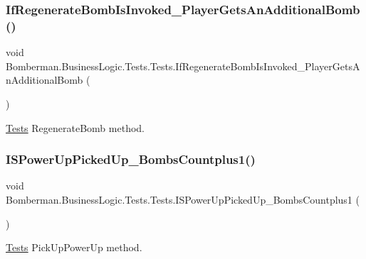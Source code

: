 \subsubsection{\texorpdfstring{IfRegenerateBombIsInvoked\_PlayerGetsAnAdditionalBomb()}{IfRegenerateBombIsInvoked\_PlayerGetsAnAdditionalBomb()}}
{\footnotesize\ttfamily void Bomberman.\+Business\+Logic.\+Tests.\+Tests.\+If\+Regenerate\+Bomb\+Is\+Invoked\+\_\+\+Player\+Gets\+An\+Additional\+Bomb (\begin{DoxyParamCaption}{ }\end{DoxyParamCaption})\hspace{0.3cm}{\ttfamily [inline]}}



\mbox{\hyperlink{class_bomberman_1_1_business_logic_1_1_tests_1_1_tests}{Tests}} Regenerate\+Bomb method. 

\mbox{\label{class_bomberman_1_1_business_logic_1_1_tests_1_1_tests_a4a3dc6bb902a84fccc6eaaffebebeae1}} 
\subsubsection{\texorpdfstring{ISPowerUpPickedUp\_BombsCountplus1()}{ISPowerUpPickedUp\_BombsCountplus1()}}
{\footnotesize\ttfamily void Bomberman.\+Business\+Logic.\+Tests.\+Tests.\+I\+S\+Power\+Up\+Picked\+Up\+\_\+\+Bombs\+Countplus1 (\begin{DoxyParamCaption}{ }\end{DoxyParamCaption})\hspace{0.3cm}{\ttfamily [inline]}}



\mbox{\hyperlink{class_bomberman_1_1_business_logic_1_1_tests_1_1_tests}{Tests}} Pick\+Up\+Power\+Up method. 

\mbox{\label{class_bomberman_1_1_business_logic_1_1_tests_1_1_tests_abd8cb0b5bcdb7bc95afd06e338a68fba}} 
